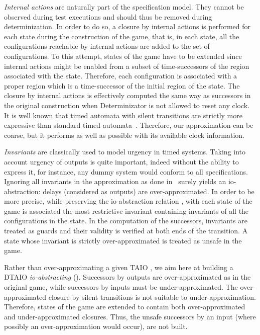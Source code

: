 \documentclass{LMCS}
\theoremstyle{plain}\newtheorem{proposition}[thm]{Proposition}
\begin{document}
\begin{iteMize}{}
\item
\textit{Internal actions} are naturally part of the specification
  model.  They cannot be observed during test executions and should
  thus be removed during determinization.  In order to do so, a
  closure by internal actions is performed for each state during the
  construction of the game, that is, in each state, all the configurations reachable by internal
  actions are added to the set of configurations. To this attempt, states of the game have to be extended since internal 
actions might be enabled from a subset of time-successors 
of the region associated with the state.  Therefore, each
configuration is associated with a proper region which is a
time-successor of the initial region of the state.
The closure by internal actions is effectively computed the same way
as successors in the original construction when Determinizator is
  not allowed to reset any clock.
It is well known that timed automata with silent transitions are
  strictly more expressive than standard timed
  automata~\cite{BerardGastinPetit-STACS96}.  Therefore, our
  approximation can be coarse, but it performs as well as possible
  with its available clock information.
\item
\textit{Invariants} are classically used to model urgency in timed
  systems.
Taking into account urgency of outputs is quite important, indeed
  without the ability to express it, for instance, any dummy system would conform to all specifications. Ignoring all
  invariants in the approximation as done in~\cite{KrichenTripakis09}
  surely yields an io-abstraction: delays (considered as outputs) are
  over-approximated.  In order to be more precise, while preserving
  the io-abstraction relation , with each state of the game
  is associated the most restrictive invariant containing invariants
  of all the configurations in the state.  In the computation of the
  successors, invariants are treated as guards and their validity is
  verified at both ends of the transition.  A state whose
  invariant is strictly over-approximated is treated as unsafe in the
  game.
\item
Rather than over-approximating a given TAIO , we aim here at
building a DTAIO  \textit{io-abstracting}  ().
Successors by outputs are over-approximated as in the original game,
while successors by inputs must be under-approximated. The over-approximated closure by silent transitions is not suitable to under-approximation.
Therefore, states of the game are extended to contain both over-approximated and under-approximated closures.
Thus, the
unsafe successors by an input (where possibly an over-approximation
would occur), are not built.
\end{iteMize}
\end{document}
